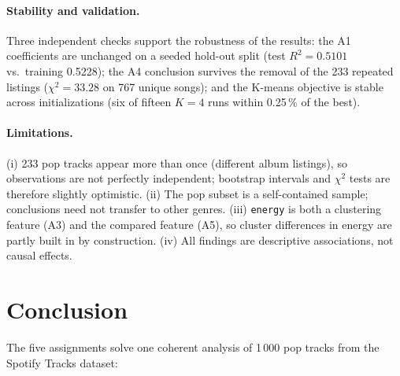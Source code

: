 \documentclass[11pt,letterpaper]{article}
\begin{document}
\paragraph{Stability and validation.} Three independent checks support the
robustness of the results: the A1 coefficients are unchanged on a seeded
hold-out split (test $R^2 = 0.5101$ vs.\ training 0.5228); the A4 conclusion
survives the removal of the 233 repeated listings ($\chi^2 = 33.28$ on 767
unique songs); and the K-means objective is stable across initializations
(six of fifteen $K=4$ runs within 0.25\,\% of the best).

\paragraph{Limitations.} (i) 233 pop tracks appear more than once (different
album listings), so observations are not perfectly independent; bootstrap
intervals and $\chi^2$ tests are therefore slightly optimistic. (ii) The pop
subset is a self-contained sample; conclusions need not transfer to other
genres. (iii) \texttt{energy} is both a
clustering feature (A3) and the compared feature (A5), so cluster differences
in energy are partly built in by construction. (iv) All findings are
descriptive associations, not causal effects.

\section{Conclusion}\label{sec:conc}

The five assignments solve one coherent analysis of 1\,000 pop tracks from
the Spotify Tracks dataset:
\end{document}
